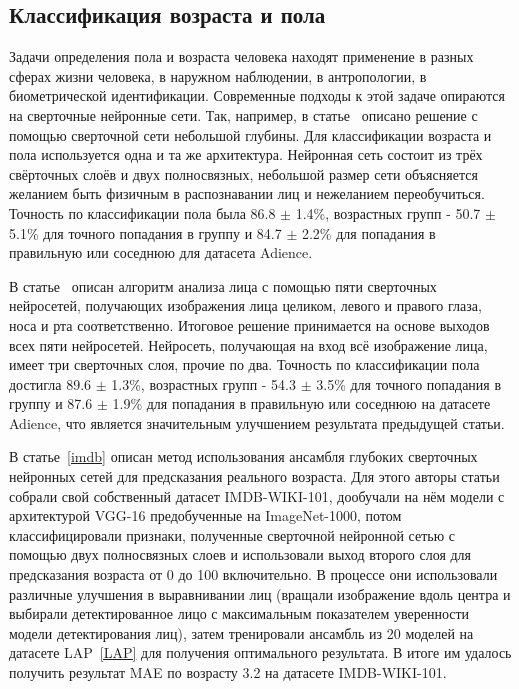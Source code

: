 \subsection{Классификация возраста и пола}\label{subsec:классификация-возраста-и-пола}
\par Задачи определения пола и возраста человека находят применение в разных сферах жизни человека, в наружном наблюдении, в антропологии, в биометрической идентификации.
Современные подходы к этой задаче опираются на сверточные нейронные сети.
Так, например, в статье~\cite{hassner} описано решение с помощью сверточной сети небольшой глубины.
Для классификации возраста и пола используется одна и та же архитектура.
Нейронная сеть состоит из трёх свёрточных слоёв и двух полносвязных,
небольшой размер сети объясняется желанием быть физичным в распознавании лиц и нежеланием переобучиться.
Точность по классификации пола была 86.8 $\pm$ 1.4\%,
возрастных групп - 50.7 $\pm$ 5.1\% для точного попадания в группу и 84.7 $\pm$ 2.2\% для попадания в правильную или соседнюю для датасета Adience.
\par В статье~\cite{INDIA} описан алгоритм анализа лица с помощью пяти сверточных нейросетей, получающих изображения лица целиком, левого и правого глаза, носа и рта соответственно.
Итоговое решение принимается на основе выходов всех пяти нейросетей.
Нейросеть, получающая на вход всё изображение лица, имеет три сверточных слоя, прочие по два.
Точность по классификации пола достигла 89.6 $\pm$ 1.3\%,
возрастных групп - 54.3 $\pm$ 3.5\% для точного попадания в группу и 87.6 $\pm$ 1.9\% для попадания в правильную или соседнюю на датасете Adience,
что является значительным улучшением результата предыдущей статьи.
\par В статье~\ref{imdb} описан метод использования ансамбля глубоких сверточных нейронных сетей для предсказания реального возраста.
Для этого авторы статьи собрали свой собственный датасет IMDB-WIKI-101,
дообучали на нём модели с архитектурой VGG-16 предобученные на ImageNet-1000,
потом классифицировали признаки, полученные сверточной нейронной сетью с помощью двух полносвязных слоев
и использовали выход второго слоя для предсказания возраста от 0 до 100 включительно.
В процессе они использовали различные улучшения в выравнивании лиц (вращали изображение вдоль центра
и выбирали детектированное лицо с максимальным показателем уверенности модели детектирования лиц),
затем тренировали ансамбль из 20 моделей на датасете LAP~\ref{LAP} для получения оптимального результата.
В итоге им удалось получить результат MAE по возрасту 3.2 на датасете IMDB-WIKI-101.
\newpage